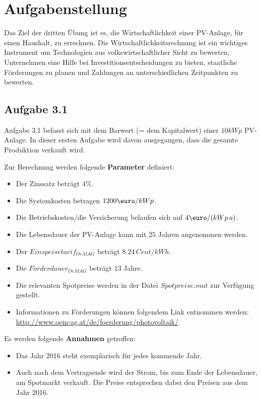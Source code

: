 \documentclass[a4paper,12pt]{article}
\begin{document}
	

	\newpage
	\tableofcontents

	\newpage
	\section{Aufgabenstellung}
	\label{sec:Aufgabenstellung}
	Das Ziel der dritten Übung ist es, die Wirtschaftlichkeit einer PV-Anlage, für einen Haushalt, zu errechnen.\newline
	Die Wirtschaftlichkeitsrechnung ist ein wichtiges Instrument um Technologien aus volkswirtschaftlicher Sicht zu bewerten,
	Unternehmen eine Hilfe bei Investitionsentscheidungen zu bieten, staatliche Förderungen zu planen und Zahlungen an unterschiedlichen Zeitpunkten zu bewerten.
	\subsection{Aufgabe 3.1}
	\label{sec:Aufgabenstellung31}
	Aufgabe 3.1 befasst sich mit dem Barwert (= dem Kapitalwert) einer $10kWp$ PV-Anlage.\newline
	In dieser ersten Aufgabe wird davon ausgegangen, dass die gesamte Produktion verkauft wird.\\ \par
	\noindent Zur Berechnung werden folgende \textbf{Parameter} definiert:
	\begin{itemize}
		\item Der Zinssatz beträgt $4\%$.
		\item Die Systemkosten betragen $1200\mbox{\euro}/kWp$.
		\item Die Betriebskosten/die Versicherung belaufen sich auf $4\mbox{\euro}/(kWp\,a)$.
		\item Die Lebensdauer der PV-Anlage kann mit $25$ Jahren angenommen werden.
		\item Der $Einspeisetarif_{OeMAG}$ beträgt $8.24\,Cent/kWh$.
		\item Die $F\ddot{o}rderdauer_{OeMAG}$ beträgt $13$ Jahre.
		\item Die relevanten Spotpreise werden in der Datei $Spotpreise.mat$ zur Verfügung gestellt.
		\item Informationen zu Förderungen können folgendem Link entnommen werden:\newline
		\url{http://www.oem-ag.at/de/foerderung/photovoltaik/}
	\end{itemize}
	Es werden folgende \textbf{Annahmen} getroffen:
	\begin{itemize}
		\item Das Jahr 2016 steht exemplarisch für jedes kommende Jahr.
		\item Auch nach dem Vertragsende wird der Strom, bis zum Ende der Lebensdauer, am Spotmarkt verkauft. Die Preise entsprechen dabei den Preisen aus dem Jahr 2016.
	\end{itemize}
\end{document}
